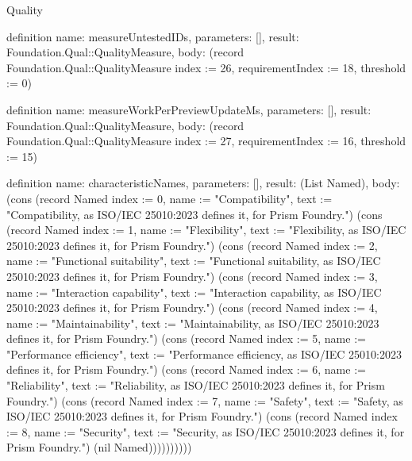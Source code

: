\begin{lexlean}{Quality}
\begin{semanticmodule}
definition{
  name: measureUntestedIDs,
  parameters: [],
  result: Foundation.Qual::QualityMeasure,
  body: (record Foundation.Qual::QualityMeasure {index := 26, requirementIndex := 18, threshold := 0})
}

definition{
  name: measureWorkPerPreviewUpdateMs,
  parameters: [],
  result: Foundation.Qual::QualityMeasure,
  body: (record Foundation.Qual::QualityMeasure {index := 27, requirementIndex := 16, threshold := 15})
}

definition{
  name: characteristicNames,
  parameters: [],
  result: (List Named),
  body: (cons (record Named {index := 0, name := "Compatibility", text := "Compatibility, as ISO/IEC 25010:2023 defines it, for Prism Foundry."}) (cons (record Named {index := 1, name := "Flexibility", text := "Flexibility, as ISO/IEC 25010:2023 defines it, for Prism Foundry."}) (cons (record Named {index := 2, name := "Functional suitability", text := "Functional suitability, as ISO/IEC 25010:2023 defines it, for Prism Foundry."}) (cons (record Named {index := 3, name := "Interaction capability", text := "Interaction capability, as ISO/IEC 25010:2023 defines it, for Prism Foundry."}) (cons (record Named {index := 4, name := "Maintainability", text := "Maintainability, as ISO/IEC 25010:2023 defines it, for Prism Foundry."}) (cons (record Named {index := 5, name := "Performance efficiency", text := "Performance efficiency, as ISO/IEC 25010:2023 defines it, for Prism Foundry."}) (cons (record Named {index := 6, name := "Reliability", text := "Reliability, as ISO/IEC 25010:2023 defines it, for Prism Foundry."}) (cons (record Named {index := 7, name := "Safety", text := "Safety, as ISO/IEC 25010:2023 defines it, for Prism Foundry."}) (cons (record Named {index := 8, name := "Security", text := "Security, as ISO/IEC 25010:2023 defines it, for Prism Foundry."}) (nil Named))))))))))
}


\end{semanticmodule}
\end{lexlean}
